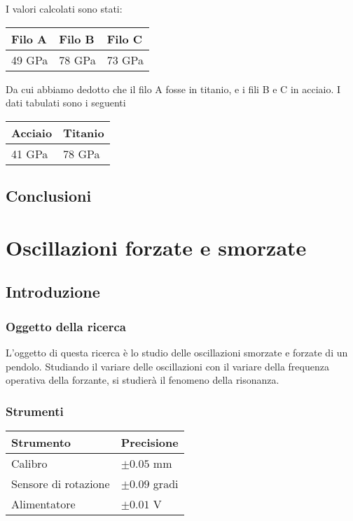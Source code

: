 \documentclass[a4paper,10pt]{report}
\begin{document}
I valori calcolati sono stati:
\begin{center}
\begin{tabular}{lll}
Filo A & Filo B & Filo C \\
\midrule
49 GPa & 78 GPa & 73 GPa \\
\end{tabular}
\end{center}

Da cui abbiamo dedotto che il filo A fosse in titanio, e i fili B e C in acciaio.
I dati tabulati sono i seguenti
\begin{center}
\begin{tabular}{ll}
Acciaio & Titanio \\
\midrule
41 GPa & 78 GPa \\
\end{tabular}
\end{center}

\section{Conclusioni}

\chapter{Oscillazioni forzate e smorzate}

\section{Introduzione}
\subsection{Oggetto della ricerca}
L'oggetto di questa ricerca è lo studio delle oscillazioni smorzate e forzate di un pendolo. Studiando il variare delle oscillazioni con il variare della frequenza operativa della forzante, si studierà il fenomeno della risonanza.
\subsection{Strumenti}
\begin{tabular}{l|l}
\midrule
Strumento & Precisione\\
\midrule
Calibro & $\pm 0.05$ mm\\ 
Sensore di rotazione & $\pm 0.09$ gradi\\ 
Alimentatore & $\pm 0.01$ V\\ 
\midrule
\end{tabular}
\end{document}
